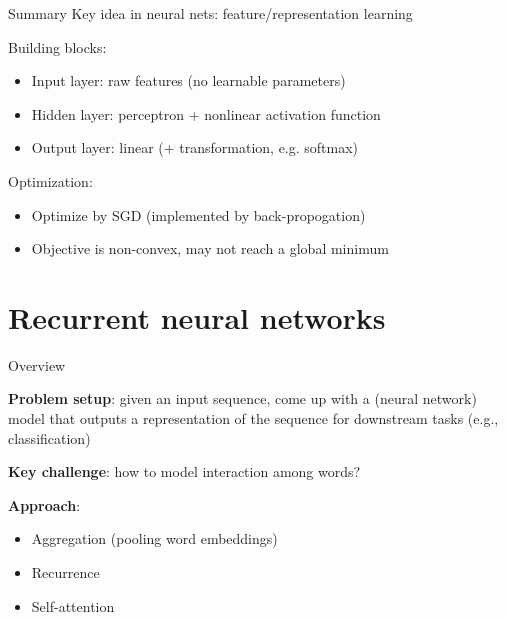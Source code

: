 \documentclass[usenames,dvipsnames,notes,11pt,aspectratio=169,hyperref={colorlinks=true, linkcolor=blue}]{beamer}
\begin{document}
\begin{frame}
    {Summary}
    Key idea in neural nets: feature/representation learning 

    Building blocks:\\
    \begin{itemize}
        \item Input layer: raw features (no learnable parameters)
        \item Hidden layer: perceptron + nonlinear activation function
        \item Output layer: linear (+ transformation, e.g. softmax)
    \end{itemize}

    Optimization:\\
    \begin{itemize}
        \item Optimize by SGD (implemented by back-propogation)
        \item Objective is non-convex, may not reach a global minimum
    \end{itemize}
\end{frame}

\section{Recurrent neural networks}

\begin{frame}
    {Overview}
    
    \textbf{Problem setup}: given an input sequence, come up with a (neural network) model that outputs a representation of the sequence for downstream tasks (e.g., classification)
    \pause

    \textbf{Key challenge}: how to model interaction among words?

    \pause
    \textbf{Approach}:\\
    \begin{itemize}
        \item Aggregation (pooling word embeddings)
        \item Recurrence
        \item Self-attention
    \end{itemize}
\end{frame}
\end{document}
